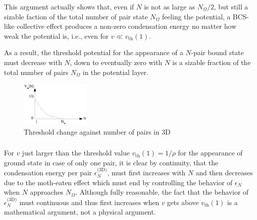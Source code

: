\documentclass{article}
\newcommand{\sd}{{\ensuremath{{\text{(3D)}}}}}
\begin{document}
This argument actually shows that, even if $N$ is not as large as $N_\Omega/2$, but still a sizable faction of the total number of pair state $N_\Omega$ feeling the potential,  a BCS-like collective effect  produces a non-zero condensation energy no matter how weak the potential is, i.e., even for $v\ll{}v_\text{th}(1)$. 

As a result, the threshold potential for the appearance of a $N$-pair bound state must decrease with $N$, down to eventually zero with $N$ is a sizable fraction of the total number of pairs $N_\Omega$ in the potential layer. 

\begin{figure}[htb]
	\centering
		\includegraphics[width=0.30\textwidth]{3dThresholdChange.eps}
	\caption{Threshold change against number of pairs in 3D}
	\label{fig:3dThresholdChange}
\end{figure}

\subsubsection{}
For $v$ just larger than the threshold value $v_{\text{th}}(1)=1/\rho$ for the appearance of ground state in case of only one pair, it is clear by continuity, that the condensation energy per pair $\epsilon^\sd_N$, must first increases with $N$ and then decreases due to the moth-eaten effect which must end by controlling the behavior of $\epsilon_N$ when $N$ approaches $N_\Omega$.  Although fully reasonable, the fact that the behavior of $\epsilon^\sd_N$ must continuous and thus first increases when $v$ gets above $v_{\text{th}}(1)$ is a mathematical argument, not a physical argument. 
\end{document}
